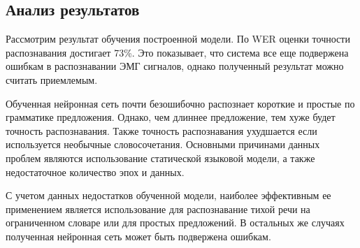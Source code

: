 \subsection{Анализ результатов}

Рассмотрим результат обучения построенной модели. По WER оценки точности распознавания достигает 73\%. Это показывает, что система все еще подвержена ошибкам в распознавании ЭМГ сигналов, однако полученный результат можно считать приемлемым.

Обученная нейронная сеть почти безошибочно распознает короткие и простые по грамматике предложения. Однако, чем длиннее предложение, тем хуже будет точность распознавания. Также точность распознавания ухудшается если используется необычные словосочетания.  Основными причинами данных проблем являются использование статической языковой модели, а также недостаточное количество эпох и данных.

С учетом данных недостатков обученной модели, наиболее эффективным ее применением является использование для распознавание тихой речи на ограниченном словаре или для простых предложений. В остальных же случаях полученная нейронная сеть может быть подвержена ошибкам.

